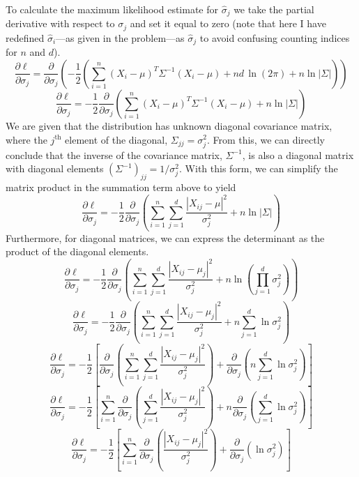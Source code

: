 \documentclass{report}
\begin{document}
To calculate the maximum likelihood estimate for $\hat{\sigma}_j$ we take the partial derivative with respect to $\sigma_j$ and set it equal to zero (note that here I have redefined $\hat{\sigma}_i$---as given in the problem---as $\hat{\sigma}_j$ to avoid confusing counting indices for $n$ and $d$).
$$ \frac{\partial \ell}{\partial \sigma_j} = \frac{\partial}{\partial \sigma_j}\left( -\frac{1}{2}\left(\sum_{i=1}^n{(X_i-\mu)^T\Sigma^{-1}(X_i-\mu)} + nd\,{\ln (2\pi)} + n\ln |\Sigma| \right) \right) $$
$$ \frac{\partial \ell}{\partial \sigma_j} =  -\frac{1}{2} \frac{\partial}{\partial \sigma_j}\left(\sum_{i=1}^n{(X_i-\mu)^T\Sigma^{-1}(X_i-\mu)} + n\ln |\Sigma| \right) $$
We are given that the distribution has unknown diagonal covariance matrix, where the $j^{\text{th}}$ element of the diagonal, $\Sigma_{jj} = \sigma_j^2$. From this, we can directly conclude that the inverse of the covariance matrix, $\Sigma^{-1}$,  is also a diagonal matrix with diagonal elements $(\Sigma^{-1})_{jj} = 1/\sigma_{j}^2$. With this form, we can simplify the matrix product in the summation term above to yield
$$ \frac{\partial \ell}{\partial \sigma_j} =  -\frac{1}{2} \frac{\partial}{\partial \sigma_j}\left(\sum_{i=1}^n{\sum_{j=1}^d{\frac{|X_{ij}-\mu|^2}{\sigma_{j}^2}}} + n\ln |\Sigma| \right) $$
Furthermore, for diagonal matrices, we can express the determinant as the product of the diagonal elements.
$$ \frac{\partial \ell}{\partial \sigma_j} =  -\frac{1}{2} \frac{\partial}{\partial \sigma_j}\left(\sum_{i=1}^n{\sum_{j=1}^d{\frac{|X_{ij}-\mu_j|^2}{\sigma_{j}^2}}} + n\ln \left(\prod_{j=1}^d{\sigma_j^2}\right) \right)$$
$$ \frac{\partial \ell}{\partial \sigma_j} =  -\frac{1}{2} \frac{\partial}{\partial \sigma_j}\left(\sum_{i=1}^n{\sum_{j=1}^d{\frac{|X_{ij}-\mu_j|^2}{\sigma_{j}^2}}} + n\sum_{j=1}^d{\ln \sigma_j^2} \right)$$
$$ \frac{\partial \ell}{\partial \sigma_j} =  -\frac{1}{2}\left[\frac{\partial}{\partial \sigma_j}\left(\sum_{i=1}^n{\sum_{j=1}^d{\frac{|X_{ij}-\mu_j|^2}{\sigma_{j}^2}}}\right)+  \frac{\partial}{\partial \sigma_j}\left( n\sum_{j=1}^d{\ln \sigma_j^2} \right)\right]$$
$$ \frac{\partial \ell}{\partial \sigma_j} =  -\frac{1}{2}\left[\sum_{i=1}^n{\frac{\partial}{\partial \sigma_j}\left(\sum_{j=1}^d{\frac{|X_{ij}-\mu_j|^2}{\sigma_{j}^2}}\right)}+  n\frac{\partial}{\partial \sigma_j}\left( \sum_{j=1}^d{\ln \sigma_j^2} \right)\right]$$
$$ \frac{\partial \ell}{\partial \sigma_j} =  -\frac{1}{2}\left[\sum_{i=1}^n{\frac{\partial}{\partial \sigma_j}\left(\frac{|X_{ij}-\mu_j|^2}{\sigma_{j}^2}\right)}+  \frac{\partial}{\partial \sigma_j}\left( \ln \sigma_j^2 \right)\right]$$
\end{document}
